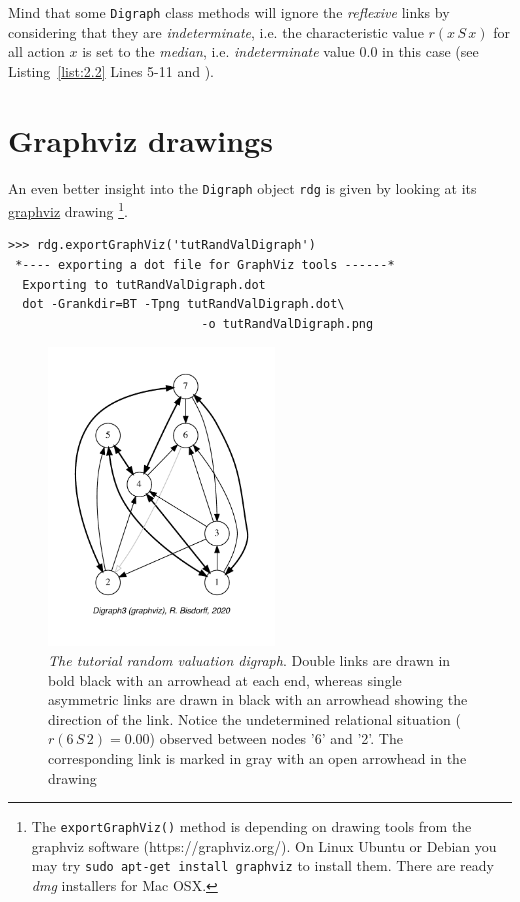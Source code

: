 Mind that some \texttt{Digraph} class methods will ignore the \emph{reflexive} links by considering that they are \emph{indeterminate}, i.e. the characteristic value $r(x\,S\,x)$ for all action $x$ is set to the \emph{median}, i.e. \emph{indeterminate} value $0.0$ in this case (see Listing~\vref{list:2.2} Lines 5-11 and \citet{BIS-2004a}).

\section{Graphviz drawings}
\label{sec:2.2}

An even better insight into the \texttt{Digraph} object \texttt{rdg} is given by looking at its \href{https://graphviz.org/}{graphviz} drawing \footnote{The \texttt{exportGraphViz()} method is depending on drawing tools from the graphviz software (https://graphviz.org/). On Linux Ubuntu or Debian you may try \texttt{sudo apt-get install graphviz} to install them. There are ready \emph{dmg} installers for Mac OSX.}.
\begin{lstlisting}
>>> rdg.exportGraphViz('tutRandValDigraph')
 *---- exporting a dot file for GraphViz tools ------*
  Exporting to tutRandValDigraph.dot
  dot -Grankdir=BT -Tpng tutRandValDigraph.dot\
                           -o tutRandValDigraph.png
\end{lstlisting}
\begin{figure}[ht]
\sidecaption[t]
\includegraphics[width=6cm]{Figures/2-1-tutRandValDigraph.pdf}
\caption{\emph{The tutorial random valuation digraph}. Double links are drawn in bold black with an arrowhead at each end, whereas single asymmetric links are drawn in black with an arrowhead showing the direction of the link. Notice the undetermined relational situation ($r(6\,S\,2) = 0.00$) observed between nodes '6' and '2'. The corresponding link is marked in gray with an open arrowhead in the drawing}
\label{fig:2.1}       %
\end{figure}
  
